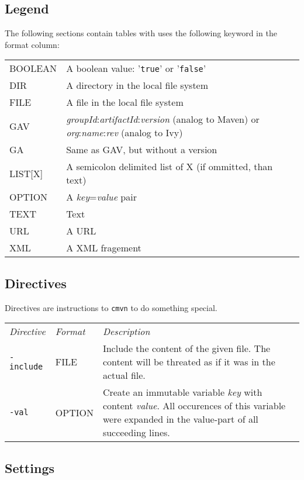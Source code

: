 \documentclass[a4paper,12pt,english,oneside,halfparskip]{scrartcl}
\newcommand{\cmvn}{\texttt{cmvn}}
\newcommand{\code}[1]{\texttt{#1}}
\begin{document}
\subsection{Legend}

The following sections contain tables with uses the following keyword in the format column:

\begin{tabular}{ll}
 BOOLEAN & A boolean value: '\code{true}' or '\code{false}' \\
 DIR & A directory in the local file system \\
 FILE & A file in the local file system \\
 GAV & \emph{groupId}:\emph{artifactId}:\emph{version} (analog to Maven) or \emph{org}:\emph{name}:\emph{rev} (analog to Ivy) \\
 GA & Same as GAV, but without a version \\
 LIST[X] & A semicolon delimited list of X (if ommitted, than text) \\
 OPTION & A \emph{key}=\emph{value} pair \\
 TEXT & Text \\
 URL & A URL \\
 XML & A XML fragement \\
\end{tabular}


\subsection{Directives}

Directives are instructions to \cmvn{} to do something special.

\begin{tabular}{llp{}}
\emph{Directive} & \emph{Format} & \emph{Description} \\
\code{-include} & FILE & Include the content of the given file. The content will be threated as if it was in the actual file. \\
\code{-val} & OPTION & Create an immutable variable \emph{key} with content \emph{value}. All occurences of this variable were expanded in the value-part of all succeeding lines. \\
\end{tabular}


\subsection{Settings}
\end{document}
